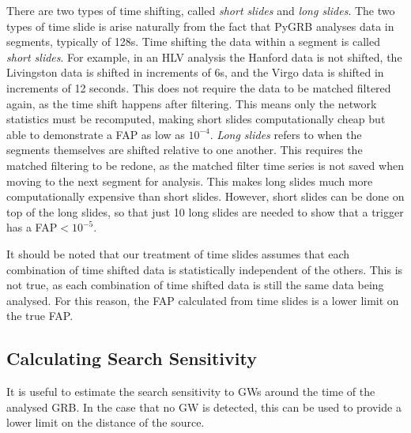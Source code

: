 \documentclass[11pt]{cuthesis}
\begin{document}
There are two types of time shifting, called \textit{short slides} and \textit{long slides}. The two types of time slide is arise naturally from the fact that PyGRB analyses data in segments, typically of 128s. Time shifting the data within a segment is called \textit{short slides}. For example, in an HLV analysis the Hanford data is not shifted, the Livingston data is shifted in increments of 6s, and the Virgo data is shifted in increments of 12 seconds. This does not require the data to be matched filtered again, as the time shift happens after filtering. This means only the network statistics must be recomputed, making short slides computationally cheap but able to demonstrate a FAP as low as $10^{-4}$. \textit{Long slides} refers to when the segments themselves are shifted relative to one another. This requires the matched filtering to be redone, as the matched filter time series is not saved when moving to the next segment for analysis. This makes long slides much more computationally expensive than short slides. However, short slides can be done on top of the long slides, so that just 10 long slides are needed to show that a trigger has a FAP$<10^{-5}$.

It should be noted that our treatment of time slides assumes that each combination of time shifted data is statistically independent of the others. This is not true, as each combination of time shifted data is still the same data being analysed. For this reason, the FAP calculated from time slides is a lower limit on the true FAP. 

\subsection{Calculating Search Sensitivity}
It is useful to estimate the search sensitivity to GWs around the time of the analysed GRB. In the case that no GW is detected, this can be used to provide a lower limit on the distance of the source.  
\end{document}
